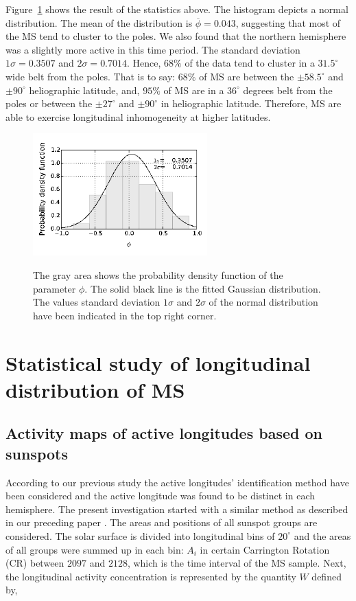 Figure~\ref{ms_dis} shows the result of the statistics above. The histogram depicts a normal distribution. The mean of the distribution is $\overline{\phi}=0.043$, suggesting that most of the MS tend to cluster to the poles. We also found that the northern hemisphere was a slightly more active in this time period. The standard deviation $1\sigma=0.3507$ and $2\sigma=0.7014$. Hence, $68\%$ of the data tend to cluster in a $31.5^{\circ}$ wide belt from the poles. That is to say: $68\%$ of MS are between the $\pm58.5^{\circ}$ and $\pm90^{\circ}$ heliographic latitude, and, $95\%$ of MS are in a $36^{\circ}$ degrees belt from the poles or between the $\pm27^{\circ}$ and $\pm90^{\circ}$ in heliographic latitude. Therefore, MS are able to exercise longitudinal inhomogeneity at higher latitudes.

\begin{figure}
	\centering
	{\includegraphics[width=0.6\textwidth]{Chapter4/Figs/MS_latitude_distribution}}
	{\caption{ The gray area shows the probability density function of the parameter $\phi$. The solid black line is the fitted Gaussian distribution. The values standard deviation $1\sigma$ and $2\sigma$ of the normal distribution have been indicated in the top right corner.}\label{ms_dis}}
\end{figure}

\section{Statistical study of longitudinal distribution of MS}
\subsection{Activity maps of active longitudes based on sunspots}

According to our previous study \citep{Gyenge2014} the active longitudes' identification method have been considered and the active longitude was found to be distinct in each hemisphere. The present investigation started with a similar method as described in our preceding paper \citep{Gyenge2012}. The areas and positions of all sunspot groups are considered. The solar surface is divided into longitudinal bins of $20^{\circ}$ and the areas of all groups were summed up in each bin: $ A_{i}$ in certain Carrington Rotation (CR) between $2097$ and $2128$, which is the time interval of the MS sample. Next, the longitudinal activity concentration is represented by the quantity $W$ defined by,

